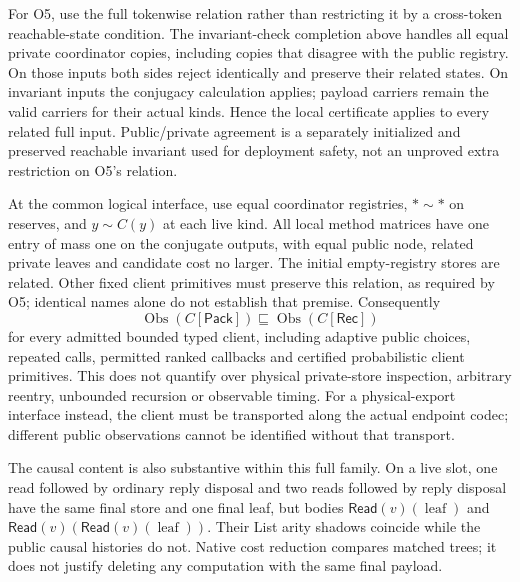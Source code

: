 \documentclass[11pt,a4paper]{article}
\theoremstyle{definition}
\newcommand{\Obs}{\operatorname{Obs}}
\newcommand{\leaf}{\operatorname{leaf}}
\begin{document}
For O5, use the full tokenwise relation rather than restricting it by a
cross-token reachable-state condition. The invariant-check completion
above handles all equal private coordinator copies, including copies
that disagree with the public registry. On those inputs both sides reject
identically and preserve their related states. On invariant inputs the
conjugacy calculation applies; payload carriers remain the valid carriers
for their actual kinds. Hence the local certificate applies to every
related full input. Public/private agreement is a separately initialized
and preserved reachable invariant used for deployment safety, not an
unproved extra restriction on O5's relation.

At the common logical interface, use equal coordinator registries,
$*\sim*$ on reserves, and $y\sim C(y)$ at each live kind. All local
method matrices have one entry of mass one on the conjugate outputs,
with equal public node, related private leaves and candidate cost no
larger. The initial empty-registry stores are related. Other fixed client
primitives must preserve this relation, as required by O5; identical
names alone do not establish that premise. Consequently
\begin{equation}\label{eq:B-contextual}
\Obs(C[\mathsf{Pack}])\sqsubseteq\Obs(C[\mathsf{Rec}])
\end{equation}
for every admitted bounded typed client, including adaptive public
choices, repeated calls, permitted ranked callbacks and certified
probabilistic client primitives. This does not quantify over physical
private-store inspection, arbitrary reentry, unbounded recursion or
observable timing. For a physical-export interface instead, the client
must be transported along the actual endpoint codec; different public
observations cannot be identified without that transport.

The causal content is also substantive within this full family. On a
live slot, one read followed by ordinary reply disposal and two reads
followed by reply disposal have the same final store and one final leaf,
but bodies $\mathsf{Read}(v)(\leaf)$ and
$\mathsf{Read}(v)(\mathsf{Read}(v)(\leaf))$. Their List arity shadows
coincide while the public causal histories do not. Native cost reduction
compares matched trees; it does not justify deleting any computation
with the same final payload.
\end{document}
